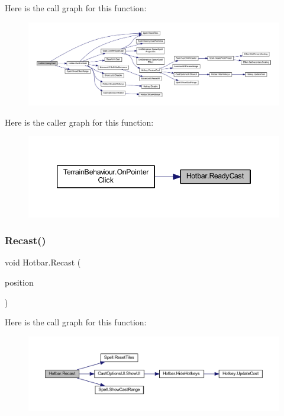 Here is the call graph for this function\+:
\nopagebreak
\begin{figure}[H]
\begin{center}
\leavevmode
\includegraphics[width=350pt]{class_hotbar_a5ac379c585126b8e0e35c061b3388ecf_cgraph}
\end{center}
\end{figure}
Here is the caller graph for this function\+:
\nopagebreak
\begin{figure}[H]
\begin{center}
\leavevmode
\includegraphics[width=346pt]{class_hotbar_a5ac379c585126b8e0e35c061b3388ecf_icgraph}
\end{center}
\end{figure}
\mbox{\label{class_hotbar_acda305961d329d3b329dbe4247539ef5}} 
\subsubsection{\texorpdfstring{Recast()}{Recast()}}
{\footnotesize\ttfamily void Hotbar.\+Recast (\begin{DoxyParamCaption}\item[{Vector2\+Int}]{position }\end{DoxyParamCaption})}

Here is the call graph for this function\+:
\nopagebreak
\begin{figure}[H]
\begin{center}
\leavevmode
\includegraphics[width=350pt]{class_hotbar_acda305961d329d3b329dbe4247539ef5_cgraph}
\end{center}
\end{figure}
\mbox{\label{class_hotbar_a989b6728a8d86d60a851f68954edab90}} 

